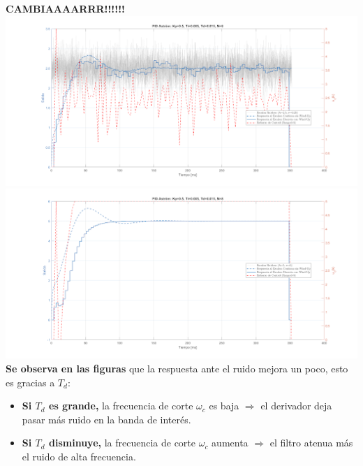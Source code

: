 \textbf{CAMBIAAAARRR!!!!!!}
\includegraphics[width=\columnwidth]{img/Astrom1.png}
\includegraphics[width=\columnwidth]{img/Astrom2.png}
\twocolumn
\textbf{Se observa en las figuras} que la respuesta ante el ruido mejora un poco, esto es gracias a $T_d$:

\begin{itemize}
	\item \textbf{Si $T_d$ es grande,} la frecuencia de corte $\omega_c$ es baja $\Rightarrow$ el derivador deja pasar más ruido en la banda de interés.
	\item \textbf{Si $T_d$ disminuye,} la frecuencia de corte $\omega_c$ aumenta $\Rightarrow$ el filtro atenua más el ruido de alta frecuencia.
\end{itemize}




